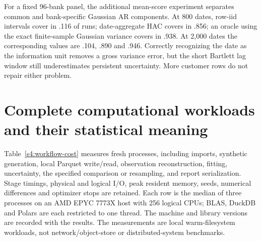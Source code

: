 For a fixed 96-bank panel, the additional mean-score experiment separates
common and bank-specific Gaussian AR components. At 800 dates, row-iid
intervals cover in .116 of runs; date-aggregate HAC covers in .856; an
oracle using the exact finite-sample Gaussian variance covers in .938.
At 2,000 dates the corresponding values are .104, .890 and .946.
Correctly recognizing the date as the information unit removes a gross
variance error, but the short Bartlett lag window still underestimates
persistent uncertainty. More customer rows do not repair either problem.

\section{Complete computational workloads and their statistical meaning}
\label{s4:workflow-results}
Table~\ref{s4:workflow-cost} measures fresh processes, including imports,
synthetic generation, local Parquet write/read, observation reconstruction,
fitting, uncertainty, the specified comparison or resampling, and report
serialization. Stage timings, physical and logical I/O, peak resident
memory, seeds, numerical differences and optimizer stops are retained.
Each row is the median of three processes on an AMD EPYC 7773X host with
256 logical CPUs; BLAS, DuckDB and Polars are each restricted to one thread.
The machine and library versions are recorded with the results. The
measurements are local warm-filesystem workloads, not network/object-store
or distributed-system benchmarks.

